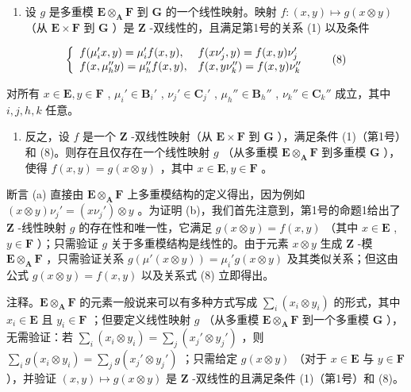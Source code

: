 \begin{enumerate}
\def\labelenumi{(\alph{enumi})}
\tightlist
\item
  设 \(g\) 是多重模 \(\mathbf{E} \otimes_{\mathbf{A}} \mathbf{F}\) 到 \(\mathbf{G}\) 的一个线性映射。映射 \(f: (x, y) \mapsto g(x \otimes y)\) （从 \(\mathbf{E} \times \mathbf{F}\) 到 \(\mathbf{G}\) ）是 \(\mathbf{Z}\) -双线性的，且满足第1号的关系 (1) 以及条件
\end{enumerate}

\[
\left\{ \begin{array}{l l} f (\mu_ {i} ^ {\prime} x, y) = \mu_ {i} ^ {\prime} f (x, y), & f (x \nu_ {j} ^ {\prime}, y) = f (x, y) \nu_ {j} ^ {\prime} \\ f (x, \mu_ {h} ^ {\prime \prime} y) = \mu_ {h} ^ {\prime \prime} f (x, y), & f (x, y \nu_ {k} ^ {\prime \prime}) = f (x, y) \nu_ {k} ^ {\prime \prime} \end{array} \right.\tag{8}
\]

对所有 \(x \in \mathbf{E}, y \in \mathbf{F}\) , \(\mu_i' \in \mathbf{B}_i'\) , \(\nu_j' \in \mathbf{C}_j'\) , \(\mu_h'' \in \mathbf{B}_h''\) , \(\nu_k'' \in \mathbf{C}_{k}''\) 成立，其中 \(i, j, h, k\) 任意。

\begin{enumerate}
\def\labelenumi{(\alph{enumi})}
\setcounter{enumi}{1}
\tightlist
\item
  反之，设 \(f\) 是一个 \(\mathbf{Z}\) -双线性映射（从 \(\mathbf{E} \times \mathbf{F}\) 到 \(\mathbf{G}\) ），满足条件 (1)（第1号）和 (8)。则存在且仅存在一个线性映射 \(g\) （从多重模 \(\mathbf{E} \otimes_{\mathbf{A}} \mathbf{F}\) 到多重模 \(\mathbf{G}\) ），使得 \(f(x, y) = g(x \otimes y)\) ，其中 \(x \in \mathbf{E}, y \in \mathbf{F}\) 。
\end{enumerate}

断言 (a) 直接由 \(\mathbf{E} \otimes_{\mathbf{A}} \mathbf{F}\) 上多重模结构的定义得出，因为例如 \((x \otimes y)\nu_j' = (x\nu_j') \otimes y\) 。为证明 (b)，我们首先注意到，第1号的命题1给出了 \(\mathbf{Z}\) -线性映射 \(g\) 的存在性和唯一性，它满足 \(g(x \otimes y) = f(x, y)\) （其中 \(x \in \mathbf{E}\) , \(y \in \mathbf{F}\) ）；只需验证 \(g\) 关于多重模结构是线性的。由于元素 \(x \otimes y\) 生成 \(\mathbf{Z}\) -模 \(\mathbf{E} \otimes_{\mathbf{A}} \mathbf{F}\) ，只需验证关系 \(g(\mu'(x \otimes y)) = \mu_i' g(x \otimes y)\) 及其类似关系；但这由公式 \(g(x \otimes y) = f(x, y)\) 以及关系式 (8) 立即得出。

注释。\(\mathbf{E} \otimes_{\mathbf{A}} \mathbf{F}\) 的元素一般说来可以有多种方式写成 \(\sum_{i} (x_i \otimes y_i)\) 的形式，其中 \(x_i \in \mathbf{E}\) 且 \(y_i \in \mathbf{F}\) ；但要定义线性映射 \(g\) （从多重模 \(\mathbf{E} \otimes_{\mathbf{A}} \mathbf{F}\) 到一个多重模 \(\mathbf{G}\) ），无需验证：若 \(\sum_{i} (x_i \otimes y_i) = \sum_{j} (x_j' \otimes y_j')\) ，则 \(\sum_{i} g(x_i \otimes y_i) = \sum_{j} g(x_j' \otimes y_j')\) ；只需给定 \(g(x \otimes y)\) （对于 \(x \in \mathbf{E}\) 与 \(y \in \mathbf{F}\) ），并验证 \((x, y) \mapsto g(x \otimes y)\) 是 \(\mathbf{Z}\) -双线性的且满足条件 (1)（第1号）和 (8)。

